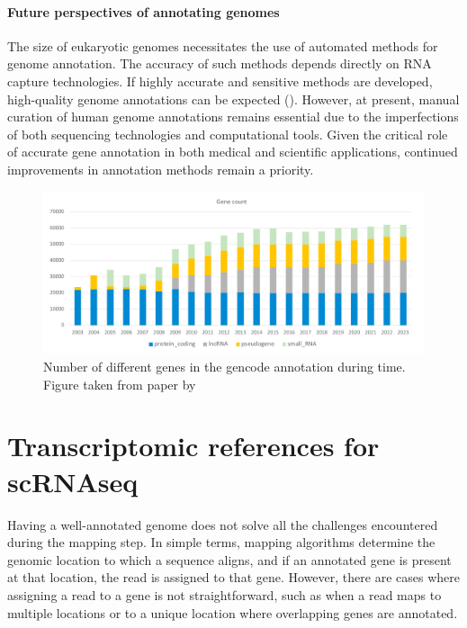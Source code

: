 \paragraph{Future perspectives of annotating genomes}

The size of eukaryotic genomes necessitates the use of automated methods for genome annotation.
The accuracy of such methods depends directly on RNA capture technologies.
If highly accurate and sensitive methods are developed, high-quality genome annotations can be expected (\cite{Salzberg2019}).
However, at present, manual curation of human genome annotations remains essential due to the imperfections of both sequencing technologies
and computational tools.
Given the critical role of accurate gene annotation in both medical and scientific applications,
continued improvements in annotation methods remain a priority.

\begin{figure}
  \centering
  \includegraphics[width=\linewidth]{images/gencode.png}
  \caption{Number of different genes in the gencode annotation during time. Figure taken from paper by \textcite{Guigo2023}}
  \label{fig:gencode}
\end{figure}

\section{Transcriptomic references for scRNAseq}

Having a well-annotated genome does not solve all the challenges encountered during the mapping step.
In simple terms, mapping algorithms determine the genomic location to which a sequence aligns,
and if an annotated gene is present at that location, the read is assigned to that gene.
However, there are cases where assigning a read to a gene is not straightforward,
such as when a read maps to multiple locations or to a unique location where overlapping genes are annotated.

